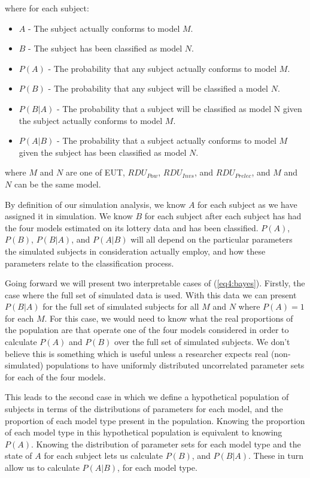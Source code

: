 \documentclass[../main.tex]{subfiles}
\begin{document}
\noindent where for each subject:

\begin{itemize}
	\item $A$ - The subject actually conforms to model $M$.
	\item $B$ - The subject has been classified as model $N$.
	\item $P(A)$ - The probability that any subject actually conforms to model $M$.
	\item $P(B)$ - The probability that any subject will be classified a model $N$.
	\item $P(B|A)$ - The probability that a subject will be classified as model N given the subject actually conforms to model $M$.
	\item $P(A|B)$ - The probability that a subject actually conforms to model $M$ given the subject has been classified as model $N$.
\end{itemize}

\noindent where $M$ and $N$ are one of EUT, $\mathit{RDU_{Pow}}$, $\mathit{RDU_{Invs}}$, and $\mathit{RDU_{Prelec}}$, and $M$ and $N$ can be the same model.

By definition of our simulation analysis, we know $A$ for each subject as we have assigned it in simulation.
We know $B$ for each subject after each subject has had the four models estimated on its lottery data and has been classified.
$P(A)$, $P(B)$, $P(B|A)$, and $P(A|B)$ will all depend on the particular parameters the simulated subjects in consideration actually employ, and how these parameters relate to the classification process.

Going forward we will present two interpretable cases of (\ref{eq4:bayes}).
Firstly, the case where the full set of simulated data is used.
With this data we can present $P(B|A)$ for the full set of simulated subjects for all $M$ and $N$ where $P(A) = 1$ for each $M$.
For this case, we would need to know what the real proportions of the population are that operate one of the four models considered in order to calculate $P(A)$ and $P(B)$ over the full set of simulated subjects.
We don't believe this is something which is useful unless a researcher expects real (non-simulated) populations to have uniformly distributed uncorrelated parameter sets for each of the four models.

This leads to the second case in which we define a hypothetical population of subjects in terms of the distributions of parameters for each model, and the proportion of each model type present in the population.
Knowing the proportion of each model type in this hypothetical population is equivalent to knowing $P(A)$.
Knowing the distribution of parameter sets for each model type and the state of $A$ for each subject lets us calculate $P(B)$, and $P(B|A)$.
These in turn allow us to calculate $P(A|B)$, for each model type.
\end{document}
